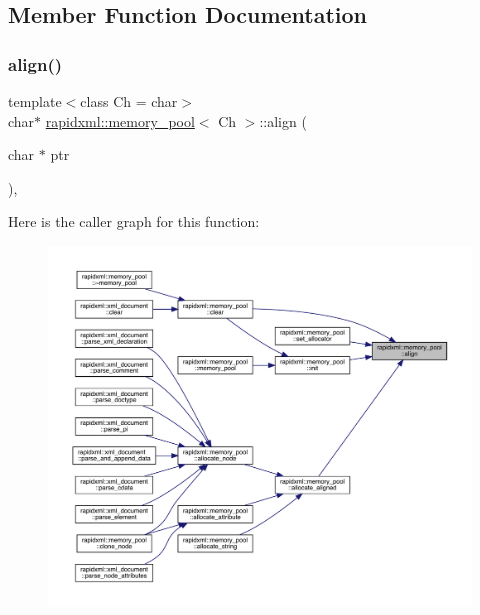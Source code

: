 \subsection{Member Function Documentation}
\mbox{\label{classrapidxml_1_1memory__pool_a317396afc1812f08b64a1dd9cde4039b}} 
\subsubsection{\texorpdfstring{align()}{align()}}
{\footnotesize\ttfamily template$<$class Ch  = char$>$ \\
char$\ast$ \mbox{\hyperlink{classrapidxml_1_1memory__pool}{rapidxml\+::memory\+\_\+pool}}$<$ Ch $>$\+::align (\begin{DoxyParamCaption}\item[{char $\ast$}]{ptr }\end{DoxyParamCaption})\hspace{0.3cm}{\ttfamily [inline]}, {\ttfamily [private]}}

Here is the caller graph for this function\+:\nopagebreak
\begin{figure}[H]
\begin{center}
\leavevmode
\includegraphics[width=350pt]{classrapidxml_1_1memory__pool_a317396afc1812f08b64a1dd9cde4039b_icgraph}
\end{center}
\end{figure}
\mbox{\label{classrapidxml_1_1memory__pool_a4e9cf53fa5f9da3a8f31b754bd94b4ec}} 
